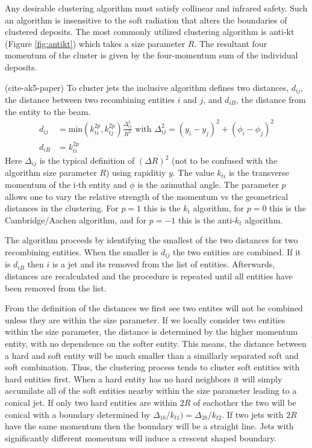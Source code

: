 Any desirable clustering algorithm must satisfy collinear and infrared safety. Such an algorithm is insensitive to the soft radiation that alters the boundaries of clustered deposits. The most commonly utilized clustering algorithm is anti-kt (Figure \ref{fig:antikt}) which takes a size 
parameter $R$.  The resultant four momentum of the cluster is given by the four-momentum sum of the individual deposits. 

(cite-ak5-paper) To cluster jets the inclusive algorithm defines two distances, $d_{ij}$, the distance between two recombining
entities $i$ and $j$, and $d_{iB}$, the distance from the entity to the beam. 
\begin{align*}
d_{ij} &= \text{min}(k_{ti}^{2p}, k_{tj}^{2p}) \frac{\Delta_{ij}^2}{R^2} \text{ with } \Delta_{ij}^2 = (y_i - y_j)^2 + (\phi_i - \phi_j)^2\\
d_{iB} &= k_{ti}^{2p} 
\end{align*}
Here $\Delta_{ij}$ is the typical definition of $(\Delta R)^2$ (not to be confused with the algorithm 
size parameter $R$) using rapiditiy $y$. The value $k_{ti}$ is the transverse momentum of
the i-th entity and $\phi$ is the azimuthal angle. The parameter $p$ allows one 
to vary the relative strength of the momentum vs the geometrical
distances in the clustering. For $p=1$ this is the $k_t$ algorithm, 
for $p=0$ this is the Cambridge/Aachen algorithm, and for $p=-1$ this is the anti-$k_t$ algorithm. 

The algorithm proceeds by identifying the smallest of the two distances for two recombining entities. When the
smaller is $d_{ij}$ the two entities are combined. If it is $d_{iB}$ then $i$ is a jet and its removed from the list
of entities. Afterwards, distances are recalculated and the procedure is repeated until all entities have been
removed from the list. 

From the definition of the distances we first see two entites will not be combined unless they are within
the size parameter. If we locally consider two entities within the size parameter, 
the distance is determined by the higher momentum entity, with no dependence on the softer entity. 
This means, the distance between a hard and soft entity will be much smaller than a 
simillarly separated soft and soft
combination. Thus, the clustering process tends to cluster soft entities with hard entities first. When a hard
entity has no hard neighbors it will simply accumilate all of the soft entities nearby within the size parameter 
leading to a conical jet. If only two hard entities are within $2R$ of eachother the two will be conical with a 
boundary determined by $\Delta_{1b} / k_{t1}) = \Delta_{2b} / k_{t2}$. If two jets with $2R$ have 
the same momentum then the boundary will be a straight line. Jets with significantly different momentum will induce
a crescent shaped boundary.

